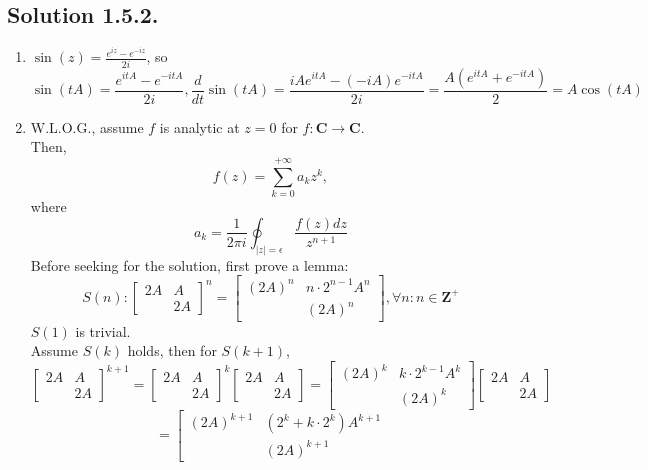 \documentclass{article}
\begin{document}
\subsection*{Solution 1.5.2.}
\begin{enumerate}
    \item $\sin(z)=\frac{e^{iz}-e^{-iz}}{2i}$, so
    \[\sin(tA)=\frac{e^{itA}-e^{-itA}}{2i},\frac{d}{dt}\sin(tA)=\frac{iAe^{itA}-(-iA)e^{-itA}}{2i}=\frac{A(e^{itA}+e^{-itA})}{2}=A\cos(tA)\]
    \item W.L.O.G., assume $f$ is analytic at $z = 0$ for $f:\mathbf{C}\to \mathbf{C}$.\\
    Then, 
    \[f(z) = \sum_{k=0}^{+\infty} a_k z^k,\]
    where 
    \[a_k = \frac{1}{2\pi i}\oint_{|z|=\epsilon} \frac{f(z)dz}{z^{n+1}}\]
    Before seeking for the solution, first prove a lemma:
    \[S(n):\left[\begin{array}{cc}
    2A & A \\
     & 2A
    \end{array}\right]^n = \left[\begin{array}{cc}
    (2A)^n & n\cdot 2^{n-1} A^n \\
     & (2A)^n
    \end{array}\right],\forall n: n\in \mathbf{Z}^+\]
    $S(1)$ is trivial.\\
    Assume $S(k)$ holds, then for $S(k+1)$,
    \[\left[\begin{array}{cc}
    2A & A \\
     & 2A
    \end{array}\right]^{k+1} = 
    \left[\begin{array}{cc}
    2A & A \\
     & 2A
    \end{array}\right]^k 
    \left[\begin{array}{cc}
    2A & A \\
     & 2A
    \end{array}\right]
    =
    \left[\begin{array}{cc}
    (2A)^k & k\cdot 2^{k-1} A^k \\
     & (2A)^k
    \end{array}\right]
    \left[\begin{array}{cc}
    2A & A \\
     & 2A
    \end{array}\right]\]
    \[=\left[\begin{array}{cc}
    (2A)^{k+1} & (2^k+k\cdot 2^k)A^{k+1} \\
     & (2A)^{k+1}

\end{array}\]
\end{enumerate}
\end{document}
